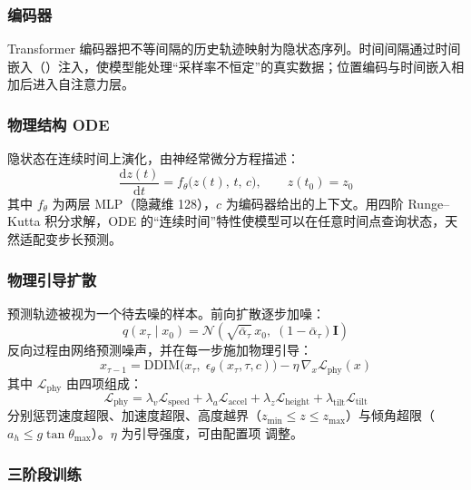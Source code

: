 \subsubsection{编码器}

Transformer 编码器把不等间隔的历史轨迹映射为隐状态序列。时间间隔通过时间嵌入（）注入，使模型能处理“采样率不恒定”的真实数据；位置编码与时间嵌入相加后进入自注意力层。

\subsubsection{物理结构 ODE}

隐状态在连续时间上演化，由神经常微分方程描述：
\begin{equation}
\frac{\mathrm{d}z(t)}{\mathrm{d}t}=f_\theta\big(z(t),\,t,\,c\big),\qquad z(t_0)=z_0
\end{equation}
其中 $f_\theta$ 为两层 MLP（隐藏维 128），$c$ 为编码器给出的上下文。用四阶 Runge--Kutta 积分求解，ODE 的“连续时间”特性使模型可以在任意时间点查询状态，天然适配变步长预测。

\subsubsection{物理引导扩散}

预测轨迹被视为一个待去噪的样本。前向扩散逐步加噪：
\begin{equation}
q(x_\tau\mid x_0)=\mathcal{N}\left(\sqrt{\bar\alpha_\tau}\,x_0,\;(1-\bar\alpha_\tau)\mathbf{I}\right)
\end{equation}
反向过程由网络预测噪声，并在每一步施加物理引导：
\begin{equation}
x_{\tau-1}=\mathrm{DDIM}\big(x_\tau,\;\epsilon_\theta(x_\tau,\tau,c)\big)
-\eta\,\nabla_{x}\mathcal{L}_{\text{phy}}(x)
\end{equation}
其中 $\mathcal{L}_{\text{phy}}$ 由四项组成：
\begin{equation}
\mathcal{L}_{\text{phy}}=\lambda_v\mathcal{L}_{\text{speed}}
+\lambda_a\mathcal{L}_{\text{accel}}
+\lambda_z\mathcal{L}_{\text{height}}
+\lambda_{\text{tilt}}\mathcal{L}_{\text{tilt}}
\end{equation}
分别惩罚速度超限、加速度超限、高度越界（$z_{\min}\leq z\leq z_{\max}$）与倾角超限（$a_h\leq g\tan\theta_{\max}$）。$\eta$ 为引导强度，可由配置项  调整。

\subsubsection{三阶段训练}

